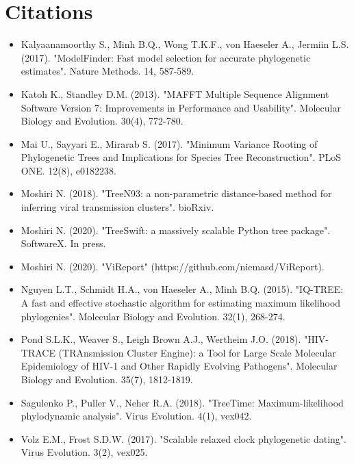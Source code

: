 \documentclass{article}
\begin{document}
\section{Citations}
\begin{itemize}
\item Kalyaanamoorthy S., Minh B.Q., Wong T.K.F., von Haeseler A., Jermiin L.S. (2017). "ModelFinder: Fast model selection for accurate phylogenetic estimates". Nature Methods. 14, 587-589.\item Katoh K., Standley D.M. (2013). "MAFFT Multiple Sequence Alignment Software Version 7: Improvements in Performance and Usability". Molecular Biology and Evolution. 30(4), 772-780.\item Mai U., Sayyari E., Mirarab S. (2017). "Minimum Variance Rooting of Phylogenetic Trees and Implications for Species Tree Reconstruction". PLoS ONE. 12(8), e0182238.\item Moshiri N. (2018). "TreeN93: a non-parametric distance-based method for inferring viral transmission clusters". bioRxiv.\item Moshiri N. (2020). "TreeSwift: a massively scalable Python tree package". SoftwareX. In press.\item Moshiri N. (2020). "ViReport" (https://github.com/niemasd/ViReport).\item Nguyen L.T., Schmidt H.A., von Haeseler A., Minh B.Q. (2015). "IQ-TREE: A fast and effective stochastic algorithm for estimating maximum likelihood phylogenies". Molecular Biology and Evolution. 32(1), 268-274.\item Pond S.L.K., Weaver S., Leigh Brown A.J., Wertheim J.O. (2018). "HIV-TRACE (TRAnsmission Cluster Engine): a Tool for Large Scale Molecular Epidemiology of HIV-1 and Other Rapidly Evolving Pathogens". Molecular Biology and Evolution. 35(7), 1812-1819.\item Sagulenko P., Puller V., Neher R.A. (2018). "TreeTime: Maximum-likelihood phylodynamic analysis". Virus Evolution. 4(1), vex042.\item Volz E.M., Frost S.D.W. (2017). "Scalable relaxed clock phylogenetic dating". Virus Evolution. 3(2), vex025.\end{itemize}
\end{document}
